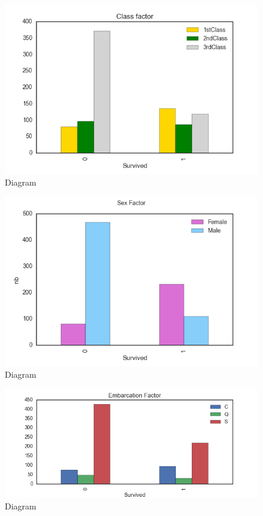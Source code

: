\documentclass[11pt]{article}
\makeatletter
\def\maxwidth{\ifdim\Gin@nat@width>\linewidth\linewidth
    \else\Gin@nat@width\fi}
\let\Oldincludegraphics\includegraphics
\renewcommand{\includegraphics}[1]{\Oldincludegraphics[width=.8\maxwidth]{#1}}
\makeatother
\begin{document}
    \begin{figure}
\centering
\includegraphics{ClassFactorv2.png}
\caption{Diagram}
\end{figure}

    \begin{figure}
\centering
\includegraphics{SexFactor.png}
\caption{Diagram}
\end{figure}

    \begin{figure}
\centering
\includegraphics{EmbarcationFactor.png}
\caption{Diagram}
\end{figure}
\end{document}
